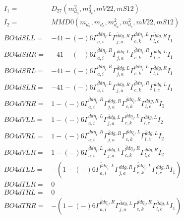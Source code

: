 \documentclass[A4,landscape]{article}
\begin{document}
\begin{align} 
I_1 = & D_{27}(m^2_{d_{{a}}}, m^2_{d_{{c}}}, mV22, mS12) \\ 
I_2 = & MMD0(m_{d_{{a}}}, m_{d_{{c}}}, m^2_{d_{{a}}}, m^2_{d_{{c}}}, mV22, mS12) \\ 
  BO4dSLL= & -4   1
-(-)
  6 \Gamma^{\bar{d}d \eta_i ,L}_{a, i} \Gamma^{\bar{d}d g ,R}_{j, a} \Gamma^{\bar{d}d \eta_i ,L}_{c, k} \Gamma^{\bar{d}d g ,R}_{l, c} I_1 \\ 
  BO4dSRR= & -4   1
-(-)
  6 \Gamma^{\bar{d}d \eta_i ,R}_{a, i} \Gamma^{\bar{d}d g ,L}_{j, a} \Gamma^{\bar{d}d \eta_i ,R}_{c, k} \Gamma^{\bar{d}d g ,L}_{l, c} I_1 \\ 
  BO4dSRL= & -4   1
-(-)
  6 \Gamma^{\bar{d}d \eta_i ,R}_{a, i} \Gamma^{\bar{d}d g ,L}_{j, a} \Gamma^{\bar{d}d \eta_i ,L}_{c, k} \Gamma^{\bar{d}d g ,R}_{l, c} I_1 \\ 
  BO4dSLR= & -4   1
-(-)
  6 \Gamma^{\bar{d}d \eta_i ,L}_{a, i} \Gamma^{\bar{d}d g ,R}_{j, a} \Gamma^{\bar{d}d \eta_i ,R}_{c, k} \Gamma^{\bar{d}d g ,L}_{l, c} I_1 \\ 
  BO4dVRR= &   1
-(-)
  6 \Gamma^{\bar{d}d \eta_i ,R}_{a, i} \Gamma^{\bar{d}d g ,R}_{j, a} \Gamma^{\bar{d}d \eta_i ,R}_{c, k} \Gamma^{\bar{d}d g ,R}_{l, c} I_2 \\ 
  BO4dVLL= &   1
-(-)
  6 \Gamma^{\bar{d}d \eta_i ,L}_{a, i} \Gamma^{\bar{d}d g ,L}_{j, a} \Gamma^{\bar{d}d \eta_i ,L}_{c, k} \Gamma^{\bar{d}d g ,L}_{l, c} I_2 \\ 
  BO4dVRL= &   1
-(-)
  6 \Gamma^{\bar{d}d \eta_i ,R}_{a, i} \Gamma^{\bar{d}d g ,R}_{j, a} \Gamma^{\bar{d}d \eta_i ,L}_{c, k} \Gamma^{\bar{d}d g ,L}_{l, c} I_2 \\ 
  BO4dVLR= &   1
-(-)
  6 \Gamma^{\bar{d}d \eta_i ,L}_{a, i} \Gamma^{\bar{d}d g ,L}_{j, a} \Gamma^{\bar{d}d \eta_i ,R}_{c, k} \Gamma^{\bar{d}d g ,R}_{l, c} I_2 \\ 
  BO4dTLL= & -(  1
-(-)
  6 \Gamma^{\bar{d}d \eta_i ,L}_{a, i} \Gamma^{\bar{d}d g ,R}_{j, a} \Gamma^{\bar{d}d \eta_i ,L}_{c, k} \Gamma^{\bar{d}d g ,R}_{l, c} I_1) \\ 
  BO4dTLR= & 0 \\ 
  BO4dTRL= & 0 \\ 
  BO4dTRR= & -(  1
-(-)
  6 \Gamma^{\bar{d}d \eta_i ,R}_{a, i} \Gamma^{\bar{d}d g ,L}_{j, a} \Gamma^{\bar{d}d \eta_i ,R}_{c, k} \Gamma^{\bar{d}d g ,L}_{l, c} I_1) \\ 
\end{align} 
\end{document}
